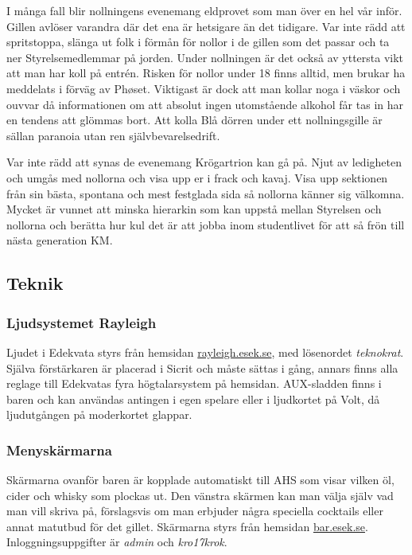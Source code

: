 \documentclass[10pt]{article}
\begin{document}
    I många fall blir nollningens evenemang eldprovet som man över en hel vår inför. Gillen avlöser varandra där det ena är hetsigare än det tidigare. Var inte rädd att spritstoppa, slänga ut folk i förmån för nollor i de gillen som det passar och ta ner Styrelsemedlemmar på jorden. Under nollningen är det också av yttersta vikt att man har koll på entrén. Risken för nollor under 18 finns alltid, men brukar ha meddelats i förväg av Phøset. Viktigast är dock att man kollar noga i väskor och ouvvar då informationen om att absolut ingen utomstående alkohol får tas in har en tendens att glömmas bort. Att kolla Blå dörren under ett nollningsgille är sällan paranoia utan ren självbevarelsedrift.

    Var inte rädd att synas de evenemang Krögartrion kan gå på. Njut av ledigheten och umgås med nollorna och visa upp er i frack och kavaj. Visa upp sektionen från sin bästa, spontana och mest festglada sida så nollorna känner sig välkomna. Mycket är vunnet att minska hierarkin som kan uppstå mellan Styrelsen och nollorna och berätta hur kul det är att jobba inom studentlivet för att så frön till nästa generation KM.

    \subsection{Teknik}
    \subsubsection*{Ljudsystemet Rayleigh}
    Ljudet i Edekvata styrs från hemsidan \url{rayleigh.esek.se}, med lösenordet \textit{teknokrat}. Själva förstärkaren är placerad i Sicrit och måste sättas i gång, annars finns alla reglage till Edekvatas fyra högtalarsystem på hemsidan. AUX-sladden finns i baren och kan användas antingen i egen spelare eller i ljudkortet på Volt, då ljudutgången på moderkortet glappar.

    \subsubsection*{Menyskärmarna}
    Skärmarna ovanför baren är kopplade automatiskt till AHS som visar vilken öl, cider och whisky som plockas ut. Den vänstra skärmen kan man välja själv vad man vill skriva på, förslagsvis om man erbjuder några speciella cocktails eller annat matutbud för det gillet. Skärmarna styrs från hemsidan \url{bar.esek.se}. Inloggningsuppgifter är \textit{admin} och \textit{kro17krok}.
\end{document}
